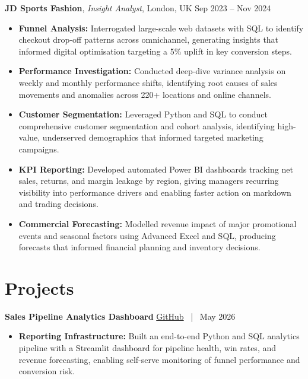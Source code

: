\documentclass[10pt, a4paper]{article}
\begin{document}
\vspace{4pt}

\textbf{JD Sports Fashion}, \textit{Insight Analyst}, London, UK \hfill Sep 2023 -- Nov 2024
\begin{itemize}
    \item \textbf{Funnel Analysis:} Interrogated large-scale web datasets with SQL to identify checkout drop-off patterns across omnichannel, generating insights that informed digital optimisation targeting a 5\% uplift in key conversion steps.
    \item \textbf{Performance Investigation:} Conducted deep-dive variance analysis on weekly and monthly performance shifts, identifying root causes of sales movements and anomalies across 220+ locations and online channels.
    \item \textbf{Customer Segmentation:} Leveraged Python and SQL to conduct comprehensive customer segmentation and cohort analysis, identifying high-value, underserved demographics that informed targeted marketing campaigns.
    \item \textbf{KPI Reporting:} Developed automated Power BI dashboards tracking net sales, returns, and margin leakage by region, giving managers recurring visibility into performance drivers and enabling faster action on markdown and trading decisions.
    \item \textbf{Commercial Forecasting:} Modelled revenue impact of major promotional events and seasonal factors using Advanced Excel and SQL, producing forecasts that informed financial planning and inventory decisions.
\end{itemize}

\section*{Projects}

\textbf{Sales Pipeline Analytics Dashboard} \hfill \href{https://github.com/VishalP44/sales-pipeline-analytics}{GitHub} \, | \, May 2026
\begin{itemize}
    \item \textbf{Reporting Infrastructure:} Built an end-to-end Python and SQL analytics pipeline with a Streamlit dashboard for pipeline health, win rates, and revenue forecasting, enabling self-serve monitoring of funnel performance and conversion risk.
\end{itemize}

\vspace{4pt}
\end{document}
